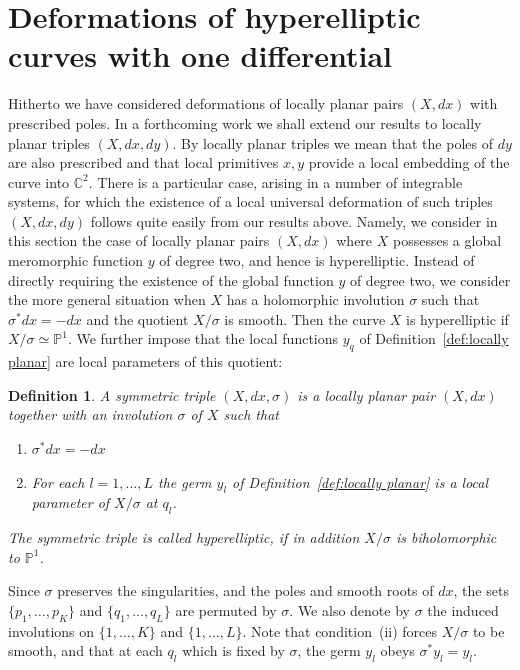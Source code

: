 \documentclass[11pt,twoside]{amsart}
\theoremstyle{plain}
\newtheorem{definition}[theorem]{Definition}
\newcommand{\dfx}{dx}
\begin{document}
\section{Deformations of hyperelliptic curves with one differential}\label{sec:def1a}
Hitherto we have considered deformations of locally planar pairs $ (X, \dfx) $ with prescribed poles. %
In a forthcoming work we shall extend our results to locally planar triples $ (X, \dfx, d y) $. By locally planar triples we mean that the poles of $dy $ are also prescribed and that local primitives $x,y $ provide a local embedding of the curve into $\mathbb C ^ 2 $.  There is a particular case, arising in a number of integrable systems, for which the existence of a local universal deformation of such triples $ (X, \dfx, d y) $ follows quite easily from our results above. Namely, we consider in this section the case of locally planar pairs $ (X, \dfx) $ where $ X $ possesses a  global meromorphic function $y$ of degree two, and hence is hyperelliptic. Instead of directly requiring the existence of the global function $y$ of degree two, we consider the more general situation when $X$ has a holomorphic involution $\sigma $ such that $\sigma^\ast \dfx=-\dfx$ and the quotient $X/\sigma$ is smooth. Then the curve $X$ is hyperelliptic if $X/\sigma \simeq \mathbb{P}^1$. We further impose that the local functions $y_q$ of Definition~\ref{def:locally planar} are local parameters of this quotient:
\begin{definition}\label{def:triple}
A \emph{symmetric triple} $(X,\dfx,\sigma)$ is a locally planar pair $(X,\dfx)$ together with an involution $\sigma$ of $X$ such that
\begin{enumerate}
\item[(i)] $\sigma^\ast\dfx=-\dfx$
\item[(ii)] For each $l=1,\ldots,L$ the germ $y_l$ of Definition~\ref{def:locally planar} is a local parameter of $X/\sigma$ at $q_l$.
\end{enumerate}
The symmetric triple is called \emph{hyperelliptic}, if in addition $X/\sigma$ is biholomorphic to $\mathbb{P}^1$.
\end{definition}
Since $\sigma$ preserves the singularities, and the poles and smooth roots of $\dfx$, the sets $\{p_1,\ldots,p_K\}$ and $\{q_1,\ldots,q_L\}$ are permuted by $\sigma$. We also denote by $\sigma$ the induced involutions on $\{1,\ldots,K\}$ and $\{1,\ldots, L\}$.
Note that condition~(ii) forces $X/\sigma$ to be smooth, and that at each $q_l$ which is fixed by $\sigma$, the germ $y_l$ obeys $\sigma^\ast y_l=y_l$.
\end{document}
